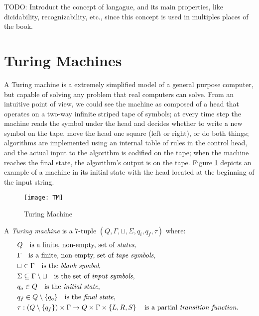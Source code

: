 {\color{red} TODO: Introduct the concept of langague, and its main properties, like dicidability, recognizability, etc., since this concept is used in multiples places of the book.}

%
%

\section{Turing Machines}
\label{sec:Turing-Machines}

A Turing machine is a extremely simplified model of a general purpose computer, but capable of solving any problem that real computers can solve. From an intuitive point of view, we could see the machine as composed of a head that operates on a two-way infinite striped tape of symbols; at every time step the machine reads the symbol under the head and decides whether to write a new symbol on the tape, move the head one square (left or right), or do both things; algorithms are implemented using an internal table of rules in the control head, and the actual input to the algorithm is codified on the tape; when the machine reaches the final state, the algorithm's output is on the tape. Figure \ref{fig:Turing-Machine} depicts an example of a machine in its initial state with the head located at the beginning of the input string.

\begin{figure}[h]
\centering\texttt{[image: TM]}
\caption{\label{fig:Turing-Machine}Turing Machine}
\end{figure}

\begin{definition}
\label{def:Turing-Machine}
A \emph{Turing machine} is a 7-tuple $\left(Q,\Gamma,\sqcup,\Sigma,q_{i},q_{f},\tau\right)$ where:
\begin{align*}
 & Q \quad \text{is a finite, non-empty, set of \emph{states},} \index{Machine State} \\
 & \Gamma \quad \text{is a finite, non-empty, set of \emph{tape symbols},} \index{Tape Symbol} \\
 & \sqcup\in\Gamma \quad \text{is the \emph{blank symbol},} \index{Blank Symbol} \\
 & \Sigma\subseteq\Gamma\setminus\sqcup \quad \text{is the set of \emph{input symbols},}  \index{Input Symbol} \\
 & q_{o}\in Q \quad \text{is the \emph{initial state},} \index{Initial State} \\
 & q_{f}\in Q \setminus \{q_o\} \quad \text{is the \emph{final state},} \index{Final State} \\ 
 & \tau:\left(Q\setminus \{q_{f}\}\right)\times\Gamma \rightarrow  Q\times\Gamma\times\left\{ L,R,S\right\} \quad\text{is a partial \emph{transition function}. \index{Transition Function} }
\end{align*}
\end{definition}

